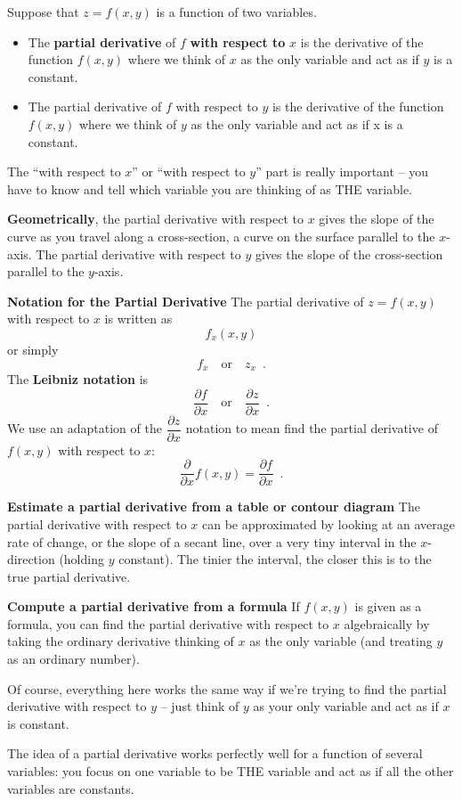 \begin{definition}
Suppose that $z=f(x,y)$ is a function of two variables.
\begin{itemize}
  \item The {\bf partial derivative} of $f$ {\bf with respect to} $x$ is the derivative of the function $f(x,y)$ where we think of $x$ as the only variable and act as if $y$ is a constant.
  \item The partial derivative of $f$ with respect to $y$ is the derivative of the function $f(x,y)$ where we think of $y$ as the only variable and act as if x is a constant.
\end{itemize}
The ``with respect to $x$'' or ``with respect to $y$'' part is really important -- you have to know and tell which variable you are thinking of as THE variable.

{\bf Geometrically}, the partial derivative with respect to $x$ gives the slope of the curve as you travel along a cross-section, a curve on the surface parallel to the $x$-axis. The partial derivative with respect to $y$ gives the slope of the cross-section parallel to the $y$-axis.

{\bf Notation for the Partial Derivative}
The partial derivative of $z=f(x,y)$ with respect to $x$ is written as
$$f_x(x,y)$$
or simply
$$f_x \quad\mbox{or}\quad z_x \enspace .$$
The {\bf Leibniz notation} is
$$\frac{\partial f}{\partial x} \quad \mbox{or} \quad \frac{\partial z}{\partial x} \enspace .$$
We use an adaptation of the $\dfrac{\partial z}{\partial x}$ notation to mean find the partial derivative of $f(x,y)$ with respect to $x$:
$$\frac{\partial}{\partial x}f(x,y)=\frac{\partial f}{\partial x} \enspace .$$

{\bf Estimate a partial derivative from a table or contour diagram}
The partial derivative with respect to $x$ can be approximated by looking at an average rate of change, or the slope of a secant line, over a very tiny interval in the $x$-direction (holding $y$ constant). The tinier the interval, the closer this is to the true partial derivative.

{\bf Compute a partial derivative from a formula}
If $f(x,y)$ is given as a formula, you can find the partial derivative with respect to $x$ algebraically by taking the ordinary derivative thinking of $x$ as the only variable (and treating $y$ as an ordinary number).

Of course, everything here works the same way if we're trying to find the partial derivative with respect to $y$ -- just think of $y$ as your only variable and act as if $x$ is constant.

The idea of a partial derivative works perfectly well for a function of several variables: you focus on one variable to be THE variable and act as if all the other variables are constants.
\end{definition}

